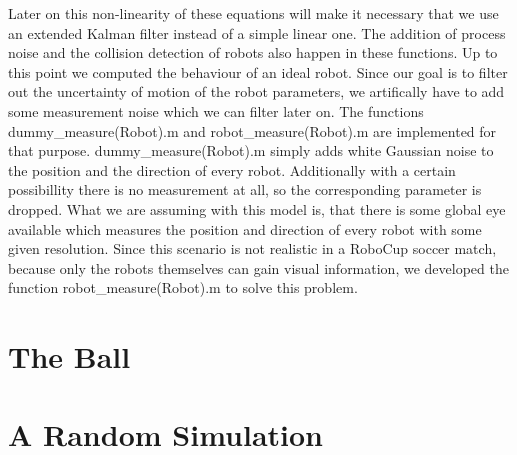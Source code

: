 
\parskip 20pt

Later on this non-linearity of these equations will make it necessary that we use an extended Kalman filter instead of a simple linear one. The addition of process noise and the collision detection of robots also happen in these functions. Up to this point we computed the behaviour of an ideal robot. Since our goal is to filter out the uncertainty of motion of the robot parameters, we artifically have to add some measurement noise which we can filter later on. The functions {\selectfont dummy\_measure(Robot).m} and {\selectfont robot\_measure(Robot).m} are implemented for that purpose. {\selectfont dummy\_measure(Robot).m} simply adds white Gaussian noise to the position and the direction of every robot. Additionally with a certain possibillity there is no measurement at all, so the corresponding parameter is dropped. What we are assuming with this model is, that there is some global eye available which measures the position and direction of every robot with some given resolution. Since this scenario is not realistic in a RoboCup soccer match, because only the robots themselves can gain visual information, we developed the function {\selectfont robot\_measure(Robot).m} to solve this problem.



\parskip 10pt

\section{The Ball}



\section{A Random Simulation}

